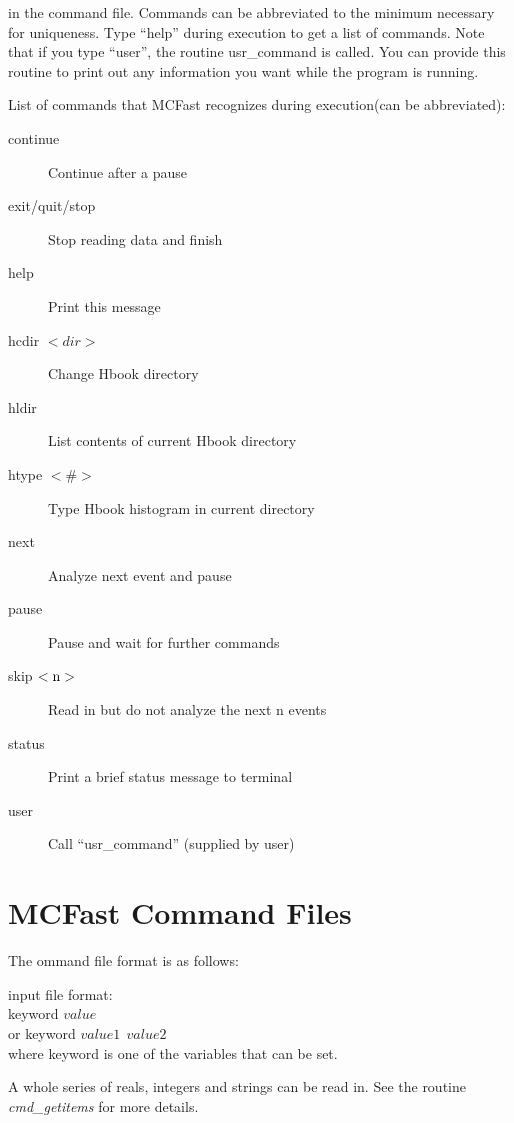 in the command file.  Commands can be
abbreviated to the minimum necessary for uniqueness. Type
``help'' during execution to get a list of commands. Note
that if you type ``user'', the routine usr\_command is
called. You can provide this routine to print out any
information you want while the program is running.  

\filbreak
 List of commands that MCFast recognizes during execution(can be abbreviated):

\begin{description}
\item[ continue ]        Continue after a pause
\item[ exit/quit/stop ]  Stop reading data and finish
\item[ help   ]          Print this message
\item[ hcdir $<dir>$ ]     Change Hbook directory
\item[ hldir  ]          List contents of current Hbook directory
\item[ htype $<\#>$ ]       Type Hbook histogram in current directory
\item[ next ]            Analyze next event and pause
\item[ pause ]           Pause and wait for further commands
\item[ skip $\rm <n>$ ]        Read in but do not analyze the next n events
\item[ status  ]         Print a brief status message to terminal
\item[ user  ]           Call ``usr\_command'' (supplied by user)
\end{description}

\filbreak

\section{MCFast Command Files}

The ommand file format is as follows:

  input file format:\\
            keyword $value$\\
        or  keyword $value1\ \ value2$\\

    where keyword is one of the variables that can be set.

A whole series of reals, integers and strings can be read in. See the
routine {\it cmd\_getitems} for more details.

